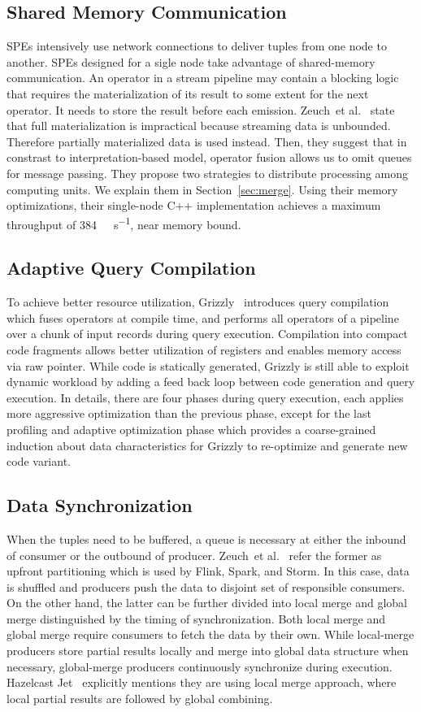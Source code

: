 \documentclass[runningheads]{llncs}
\begin{document}
\subsection{Shared Memory Communication}
\Acp{SPE} intensively use network connections to deliver tuples
from one node to another. \Acp{SPE} designed for a sigle node take advantage
of shared-memory communication.
%
An operator in a stream pipeline may contain a blocking logic that requires the
materialization of its result to some extent for the next operator. It needs to
store the result before each emission. Zeuch~et al.~\cite{Zeuch2019} state that
full materialization is impractical because streaming data is unbounded.
Therefore partially materialized data is used instead. Then, they suggest that
in constrast to interpretation-based model, operator fusion allows us to omit
queues for message passing.
They propose two strategies to distribute processing among computing units. We
explain them in Section~\ref{sec:merge}.
%
Using their memory optimizations, their single-node \ac{C++} implementation
achieves a maximum throughput of \SI{384}{\mega\tuple\per\second}, near memory
bound.

\subsection{Adaptive Query Compilation}
To achieve better resource utilization, Grizzly~\cite{Grizzly} introduces query
compilation which fuses operators at compile time, and performs all operators
of a pipeline over a chunk of input records during query execution. Compilation
into compact code fragments allows better utilization of registers and enables
memory access via raw pointer. While code is statically generated, Grizzly is
still able to exploit dynamic workload by adding a feed back loop between code
generation and query execution. In details, there are four phases during query
execution, each applies more aggressive optimization than the previous phase,
except for the last profiling and adaptive optimization phase which provides a
coarse-grained induction about data characteristics for Grizzly to re-optimize
and generate new code variant.

\subsection{Data Synchronization\label{sec:merge}}
When the tuples need to be buffered, a queue is necessary at either the inbound
of consumer or the outbound of producer. Zeuch~et al.~\cite{Zeuch2019} refer
the former as upfront partitioning which is used by Flink, Spark, and Storm. In
this case, data is shuffled and producers push the data to disjoint set of
responsible consumers. On the other hand, the latter can be further divided
into local merge and global merge distinguished by the timing of
synchronization. Both local merge and global merge require consumers to fetch
the data by their own. While local-merge producers store partial results
locally and merge into global data structure when necessary, global-merge
producers continuously synchronize during execution. Hazelcast
Jet~\cite{Hazelcast} explicitly mentions they are using local merge approach,
where local partial results are followed by global combining.
\end{document}
